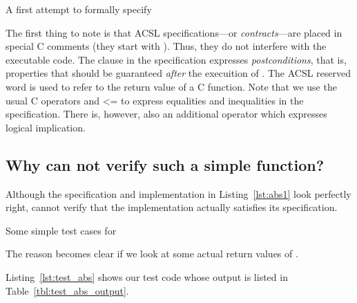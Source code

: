 \begin{listing}[hbt]
\begin{minipage}{\textwidth}

\end{minipage}
\caption{\label{lst:abs1} A first attempt to formally specify }
\end{listing}

The first thing to note is that ACSL specifications---or \emph{contracts}---are placed in special C comments
(they start with ).
Thus, they do not interfere with the executable code.
The  clause in the specification expresses \emph{postconditions},
that is, properties that should be guaranteed \emph{after} the execuition
of .
The ACSL reserved word \inl{\\result} is used to refer to the return value of a C function.
Note that we use the usual C operators \inl{==} and {<=} to express equalities and inequalities
in the specification.
There is, however, also an additional operator \inl{==>} which expresses logical implication.

\subsection{Why can \framacwp not verify such a simple function?}

Although the specification and implementation in Listing~\ref{lst:abs1} look perfectly right, 
\framacwp cannot verify that the implementation actually satisfies its specification.


\begin{listing}[hbt]
\begin{minipage}{\textwidth}

\end{minipage}
\caption{\label{lst:test_abs} Some simple test cases for }
\end{listing}

The reason becomes clear if we look at some actual return values of .
\clearpage

Listing~\ref{lst:test_abs} shows our test code whose output is listed in Table~\ref{tbl:test_abs_output}.

